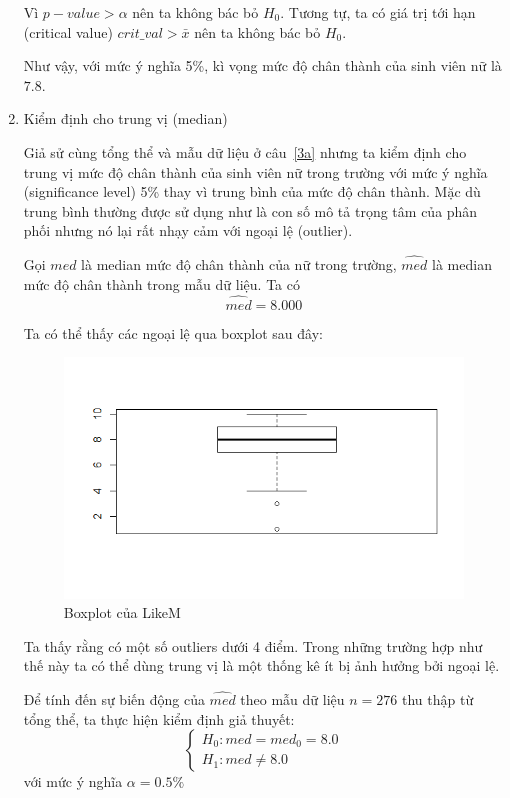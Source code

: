 \documentclass[a4paper,12pt]{article}
\begin{document}
\begin{enumerate}[label = \alph*)]
		Vì $p-value > \alpha$ nên ta không bác bỏ $H_0$. Tương tự, ta có giá trị tới hạn (critical value) $crit\_val > \bar{x}$ nên ta không bác bỏ $H_0$. 
		
		Như vậy, với mức ý nghĩa 5\%, kì vọng mức độ chân thành của sinh viên nữ là $7.8$.
	
		\item Kiểm định cho trung vị (median)
		
		Giả sử cùng tổng thể và mẫu dữ liệu ở câu~\ref{3a} nhưng ta kiểm định cho trung vị mức độ chân thành của sinh viên nữ trong trường với mức ý nghĩa (significance level) 5\% thay vì trung bình của mức độ chân thành. Mặc dù trung bình thường được sử dụng như là con số mô tả trọng tâm của phân phối nhưng nó lại rất nhạy cảm với ngoại lệ (outlier).
		
		Gọi $med$ là median mức độ chân thành của nữ trong trường, $\hat{med}$ là median mức độ chân thành trong mẫu dữ liệu. Ta có
		$$\hat{med} = 8.000$$
		
		Ta có thể thấy các ngoại lệ qua boxplot sau đây:
		\begin{figure}[H]
			\centering
			\includegraphics[width=0.7\linewidth]{Rplot3}
			\caption{Boxplot của LikeM}
			\label{fig:rplot3}
		\end{figure}
	
		Ta thấy rằng có một số outliers dưới 4 điểm. Trong những trường hợp như thế này ta có thể dùng trung vị là một thống kê ít bị ảnh hưởng bởi ngoại lệ.
		
		Để tính đến sự biến động của $\hat{med}$ theo mẫu dữ liệu $n = 276$ thu thập từ tổng thể, ta thực hiện kiểm định giả thuyết:
		\begin{equation*}
		\begin{cases}
		H_0: med = med_0 = 8.0\\
		H_1: med \neq 8.0
		\end{cases}
		\end{equation*}
		với mức ý nghĩa $\alpha = 0.5\%$
		

\end{enumerate}
\end{document}
